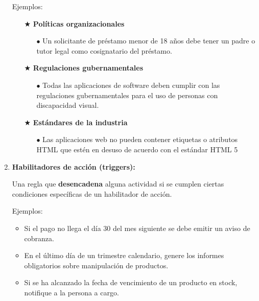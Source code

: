 \begin{enumerate}
            Ejemplos:
            
            \begin{itemize}
                \item[$\bigstar$] \textbf{Políticas organizacionales}
                    \begin{itemize}
                        \item[$\bullet$] Un solicitante de préstamo menor de 18 años debe tener un padre o tutor legal como cosignatario del préstamo.
                    \end{itemize}
                \item[$\bigstar$] \textbf{Regulaciones gubernamentales}
                    \begin{itemize}
                        \item[$\bullet$] Todas las aplicaciones de software deben cumplir con las regulaciones gubernamentales para el uso de personas con discapacidad visual.
                    \end{itemize}
                \item[$\bigstar$] \textbf{Estándares de la industria}
                    \begin{itemize}
                        \item[$\bullet$] Las aplicaciones web no pueden contener etiquetas o atributos HTML que estén en desuso de acuerdo con el estándar HTML 5 
                    \end{itemize}
            \end{itemize}
            
        \item \textbf{Habilitadores de acción (triggers):}
        
        Una regla que \textbf{desencadena} alguna actividad si se cumplen ciertas condiciones específicas de un habilitador de acción.
        
        Ejemplos:
        
        \begin{itemize}
            \item Si el pago no llega el día 30 del mes siguiente se debe emitir un aviso de cobranza.
            \item En el último día de un trimestre calendario, genere los informes obligatorios sobre manipulación de productos.
            \item Si se ha alcanzado la fecha de vencimiento de un producto en stock, notifique a la persona a cargo.
        \end{itemize}
        

\end{enumerate}
